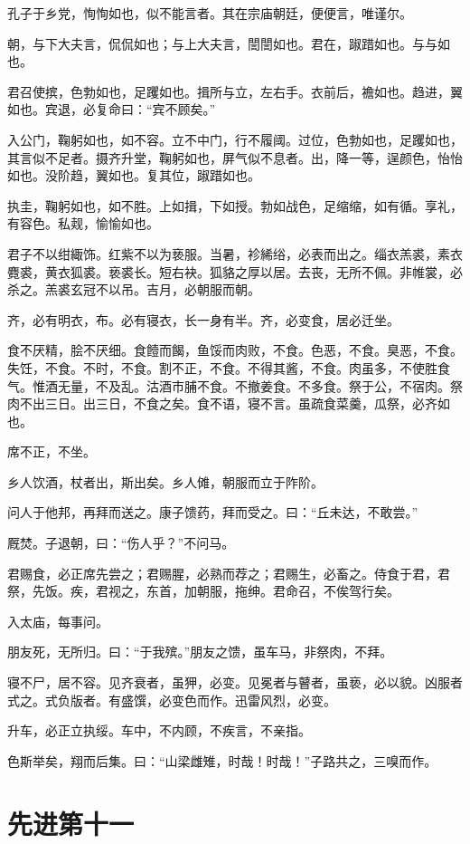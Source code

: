\documentclass[twoside,openany]{book}
\begin{document}
孔子于乡党，恂恂如也，似不能言者。其在宗庙朝廷，便便言，唯谨尔。 

朝，与下大夫言，侃侃如也；与上大夫言，誾誾如也。君在，踧踖如也。与与如也。 

君召使摈，色勃如也，足躩如也。揖所与立，左右手。衣前后，襜如也。趋进，翼如也。宾退，必复命曰：“宾不顾矣。” 

入公门，鞠躬如也，如不容。立不中门，行不履阈。过位，色勃如也，足躩如也，其言似不足者。摄齐升堂，鞠躬如也，屏气似不息者。出，降一等，逞颜色，怡怡如也。没阶趋，翼如也。复其位，踧踖如也。 

执圭，鞠躬如也，如不胜。上如揖，下如授。勃如战色，足缩缩，如有循。享礼，有容色。私觌，愉愉如也。 

君子不以绀緅饰。红紫不以为亵服。当暑，袗絺绤，必表而出之。缁衣羔裘，素衣麑裘，黄衣狐裘。亵裘长。短右袂。狐貉之厚以居。去丧，无所不佩。非帷裳，必杀之。羔裘玄冠不以吊。吉月，必朝服而朝。 

齐，必有明衣，布。必有寝衣，长一身有半。齐，必变食，居必迁坐。 

食不厌精，脍不厌细。食饐而餲，鱼馁而肉败，不食。色恶，不食。臭恶，不食。失饪，不食。不时，不食。割不正，不食。不得其酱，不食。肉虽多，不使胜食气。惟酒无量，不及乱。沽酒市脯不食。不撤姜食。不多食。祭于公，不宿肉。祭肉不出三日。出三日，不食之矣。食不语，寝不言。虽疏食菜羹，瓜祭，必齐如也。 

席不正，不坐。 

乡人饮酒，杖者出，斯出矣。乡人傩，朝服而立于阼阶。 

问人于他邦，再拜而送之。康子馈药，拜而受之。曰：“丘未达，不敢尝。” 

厩焚。子退朝，曰：“伤人乎？”不问马。 

君赐食，必正席先尝之；君赐腥，必熟而荐之；君赐生，必畜之。侍食于君，君祭，先饭。疾，君视之，东首，加朝服，拖绅。君命召，不俟驾行矣。 

入太庙，每事问。 

朋友死，无所归。曰：“于我殡。”朋友之馈，虽车马，非祭肉，不拜。 

寝不尸，居不容。见齐衰者，虽狎，必变。见冕者与瞽者，虽亵，必以貌。凶服者式之。式负版者。有盛馔，必变色而作。迅雷风烈，必变。 

升车，必正立执绥。车中，不内顾，不疾言，不亲指。 

色斯举矣，翔而后集。曰：“山梁雌雉，时哉！时哉！”子路共之，三嗅而作。 

\chapter{先进第十一}\label{ch11}
\end{document}
